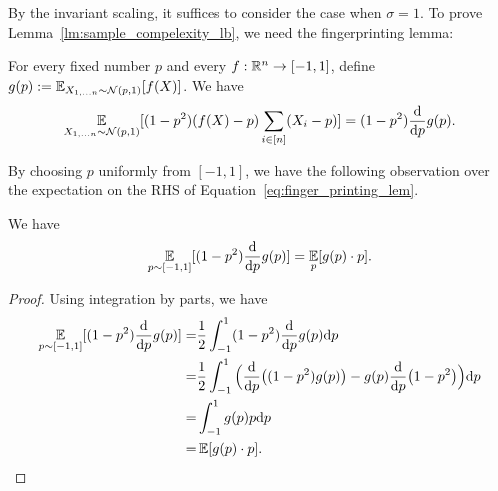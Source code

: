 By the invariant scaling, it suffices to consider the case when $\sigma=1$.
To prove Lemma~\ref{lm:sample_compelexity_lb}, we need the fingerprinting lemma:

\begin{lemma}
\label{lm:fingerprinting}
For every fixed number $p$ and every $f:\mathbb{R}^n\to[-1,1]$, define $g(p):=\operatorname*{\mathbb{E}}_{X_{1,\ldots n}\sim\mathcal{N}(p,1)}[f(X)]$.
We have
    \begin{align}
    \label{eq:finger_printing_lem}
        \operatorname*{\mathbb{E}}_{X_{1,\ldots n}\sim\mathcal{N}(p,1)}[(1-p^2)(f(X)-p)\sum_{i\in[n]}(X_i-p)]=(1-p^2)\frac{\mathrm{d}}{\mathrm{d} p}g(p).
    \end{align}
\end{lemma}

By choosing $p$ uniformly from $[-1,1]$, we have the following observation over the expectation on the RHS of Equation~\eqref{eq:finger_printing_lem}.

\begin{lemma}
\label{lm:expec_derivate}
We have
\begin{align*}
    \operatorname*{\mathbb{E}}_{p\sim[-1,1]}[(1-p^2)\frac{\mathrm{d}}{\mathrm{d} p}g(p)]= \operatorname*{\mathbb{E}}_{p}[g(p)\cdot p]. 
\end{align*}
\end{lemma}

\begin{proof}
Using integration by parts, we have
\begin{align*}
    \operatorname*{\mathbb{E}}_{p\sim[-1,1]}[(1-p^2)\frac{\mathrm{d}}{\mathrm{d} p}g(p)]= & \frac{1}{2}\int_{-1}^{1}(1-p^2)\frac{\mathrm{d}}{\mathrm{d} p}g(p)  \mathrm{d} p\\
    =&\frac{1}{2}\int_{-1}^{1}\Big(\frac{\mathrm{d}}{\mathrm{d} p}\big((1-p^2)g(p)\big)-g(p)\frac{\mathrm{d}}{\mathrm{d} p}\big(1-p^2\big)     \Big)\mathrm{d} p\\
    =&\int_{-1}^1 g(p)p \mathrm{d} p\\
    =&\operatorname*{\mathbb{E}}[g(p)\cdot p].
\end{align*}
\end{proof}

